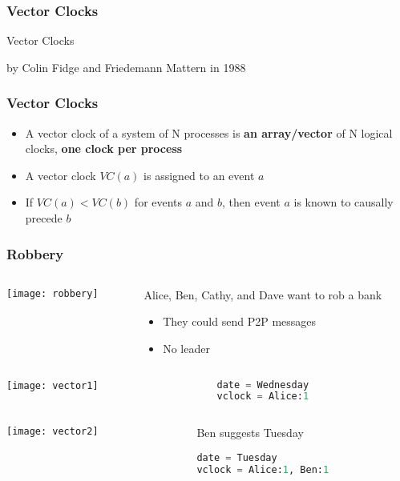 \documentclass[aspectratio=169, 15pt,usenames,dvipsnames]{beamer}
\begin{document}
	\begin{gdblank}
		\frametitle{Vector Clocks}
		\centering
		\LARGE
		Vector Clocks
		\par\large
		by Colin Fidge and Friedemann Mattern in 1988
	\end{gdblank}
	\begin{gdblank}
		\frametitle{Vector Clocks}
		\centering
		\large
		\begin{itemize}
			\item A vector clock of a system of N processes is \textbf{an array/vector} of N logical clocks, \textbf{one clock per process}
			\item A vector clock $VC(a)$ is assigned to an event $a$
			\item If $VC(a)<VC(b)$ for events $a$ and $b$, then event $a$ is known to causally precede $b$
		\end{itemize}
	\end{gdblank}
	\begin{gdblank}
		\frametitle{Robbery}
		\begin{columns}
			\begin{column}{0.5\textwidth}
				\texttt{[image: robbery]}			
			\end{column}
			\begin{column}{0.5\textwidth}
				Alice, Ben, Cathy, and Dave want to rob a bank
				\begin{itemize}
					\item They could send P2P messages
					\item No leader
				\end{itemize}
			\end{column}	
		\end{columns}
	\end{gdblank}	
	\cprotEnv\begin{gdblank}
	\begin{columns}
		\begin{column}{0.5\textwidth}
			\texttt{[image: vector1]}			
		\end{column}
		\begin{column}{0.5\textwidth}				
			\begin{lstlisting}[language=Python]
date = Wednesday
vclock = Alice:1
			\end{lstlisting}
		\end{column}	
	\end{columns} 
	\end{gdblank}
	\cprotEnv\begin{gdblank}
	\begin{columns}
		\begin{column}{0.5\textwidth}
			\texttt{[image: vector2]}			
		\end{column}
		\begin{column}{0.5\textwidth}				
			Ben suggests Tuesday
			\begin{lstlisting}[language=Python]
date = Tuesday
vclock = Alice:1, Ben:1
			\end{lstlisting}
		\end{column}	
	\end{columns} 
	\end{gdblank}
\end{document}
